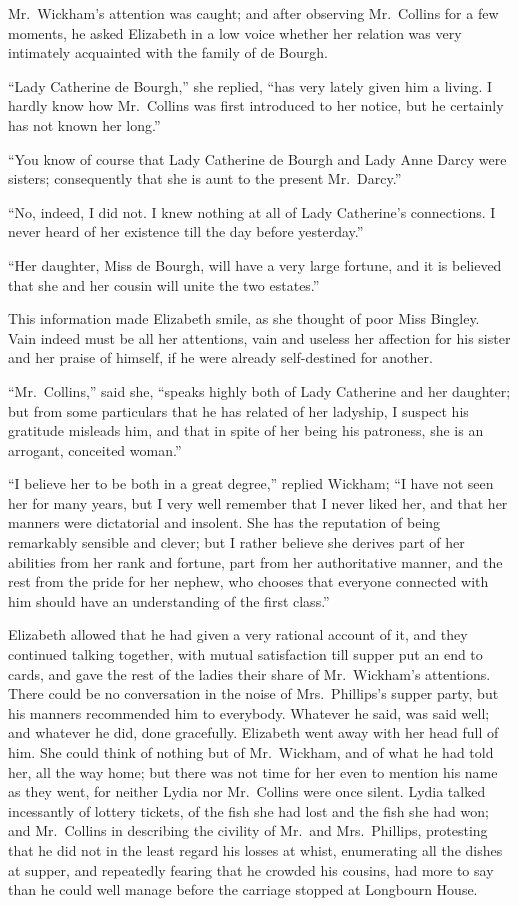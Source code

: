 \documentclass[12pt,english,oneside]{book}
\begin{document}
Mr.\ Wickham's attention was caught; and after observing Mr.\ Collins
for a few moments, he asked Elizabeth in a low voice whether her relation
was very intimately acquainted with the family of de Bourgh.

{}``Lady Catherine de Bourgh,'' she replied, {}``has very lately
given him a living. I hardly know how Mr.\ Collins was first introduced
to her notice, but he certainly has not known her long.''

{}``You know of course that Lady Catherine de Bourgh and Lady Anne
Darcy were sisters; consequently that she is aunt to the present Mr.\ Darcy.''

{}``No, indeed, I did not. I knew nothing at all of Lady Catherine's
connections. I never heard of her existence till the day before yesterday.''

{}``Her daughter, Miss de Bourgh, will have a very large fortune,
and it is believed that she and her cousin will unite the two estates.''

This information made Elizabeth smile, as she thought of poor Miss
Bingley. Vain indeed must be all her attentions, vain and useless
her affection for his sister and her praise of himself, if he were
already self-destined for another.

{}``Mr.\ Collins,'' said she, {}``speaks highly both of Lady Catherine
and her daughter; but from some particulars that he has related of
her ladyship, I suspect his gratitude misleads him, and that in spite
of her being his patroness, she is an arrogant, conceited woman.''

{}``I believe her to be both in a great degree,'' replied Wickham;
{}``I have not seen her for many years, but I very well remember
that I never liked her, and that her manners were dictatorial and
insolent. She has the reputation of being remarkably sensible and
clever; but I rather believe she derives part of her abilities from
her rank and fortune, part from her authoritative manner, and the
rest from the pride for her nephew, who chooses that everyone connected
with him should have an understanding of the first class.''

Elizabeth allowed that he had given a very rational account of it,
and they continued talking together, with mutual satisfaction till
supper put an end to cards, and gave the rest of the ladies their
share of Mr.\ Wickham's attentions. There could be no conversation
in the noise of Mrs.\ Phillips's supper party, but his manners recommended
him to everybody. Whatever he said, was said well; and whatever he
did, done gracefully. Elizabeth went away with her head full of him.
She could think of nothing but of Mr.\ Wickham, and of what he had
told her, all the way home; but there was not time for her even to
mention his name as they went, for neither Lydia nor Mr.\ Collins
were once silent. Lydia talked incessantly of lottery tickets, of
the fish she had lost and the fish she had won; and Mr.\ Collins
in describing the civility of Mr.\ and Mrs.\ Phillips, protesting
that he did not in the least regard his losses at whist, enumerating
all the dishes at supper, and repeatedly fearing that he crowded his
cousins, had more to say than he could well manage before the carriage
stopped at Longbourn House.
\end{document}
